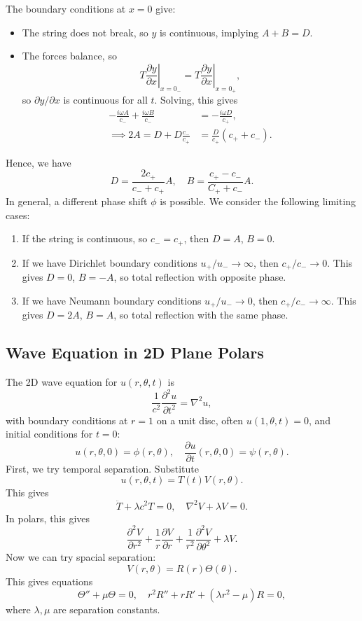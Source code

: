 \documentclass[12pt]{article}
\theoremstyle{definition}
\theoremstyle{remark}
\begin{document}
The boundary conditions at $x = 0$ give:
\begin{itemize}
	\item The string does not break, so $y$ is continuous, implying $A + B = D$.
	\item The forces balance, so
		\[
			T \left. \frac{\partial y}{\partial x}\right|_{x = 0_{-}} = T \left. \frac{\partial y}{\partial x} \right|_{x = 0_{+}}
		,\]
		so $\partial y/\partial x$ is continuous for all $t$. Solving, this gives
		\begin{align*}
			- \frac{i \omega A}{c_{-}} + \frac{i \omega B}{c_{-}} &= - \frac{i \omega D}{c_{+}}, \\
			\implies 2A = D + D\frac{c_{-}}{c_{+}} &= \frac{D}{c_{+}}(c_{+} + c_{-}).
		\end{align*}
\end{itemize}
Hence, we have
\[
D = \frac{2 c_{+}}{c_{-} + c_{+}} A, \quad B = \frac{c_{+} - c_{-}}{C_{+} + c_{-}} A
.\]
In general, a different phase shift $\phi$ is possible. We consider the following limiting cases:
\begin{enumerate}[1)]
	\item If the string is continuous, so $c_{-} = c_{+}$, then $D = A$, $B = 0$.
	\item If we have Dirichlet boundary conditions $u_{+}/u_{-} \to \infty$, then $c_{+}/c_{-} \to 0$. This gives $D = 0$, $B = -A$, so total reflection with opposite phase.
	\item If we have Neumann boundary conditions $u_{+}/u_{-} \to 0$, then $c_{+}/c_{-} \to \infty$. This gives $D = 2A$, $B = A$, so total reflection with the same phase.
\end{enumerate}

\subsection{Wave Equation in 2D Plane Polars}%
\label{sub:wave_equation_in_2d_plane_polars}


The 2D wave equation for $u(r, \theta, t)$ is
\[
\frac{1}{c^2} \frac{\partial^2 u}{\partial t^2} = \nabla^2 u
,\]
with boundary conditions at $r = 1$ on a unit disc, often $u(1, \theta, t) = 0$, and initial conditions for $t = 0$:
\[
	u(r, \theta, 0) = \phi(r, \theta), \quad \frac{\partial u}{\partial t}(r, \theta, 0) = \psi (r, \theta)
.\]
First, we try temporal separation. Substitute
\[
	u(r, \theta, t) = T(t) V(r, \theta)
.\]
This gives
\[
\ddot T + \lambda c^2 T = 0, \quad \nabla^2 V + \lambda V = 0
.\]
In polars, this gives
\[
\frac{\partial^2 V}{\partial r^2} + \frac{1}{r} \frac{\partial V}{\partial r} + \frac{1}{r^2} \frac{\partial^2 V}{\partial \theta^2} + \lambda V
.\]
Now we can try spacial separation:
\[
	V(r, \theta) = R(r) \Theta(\theta)
.\]
This gives equations
\[
	\Theta'' + \mu \Theta = 0, \quad r^2 R'' + r R' + (\lambda r^2 - \mu)R = 0
,\]
where $\lambda, \mu$ are separation constants.
\end{document}
